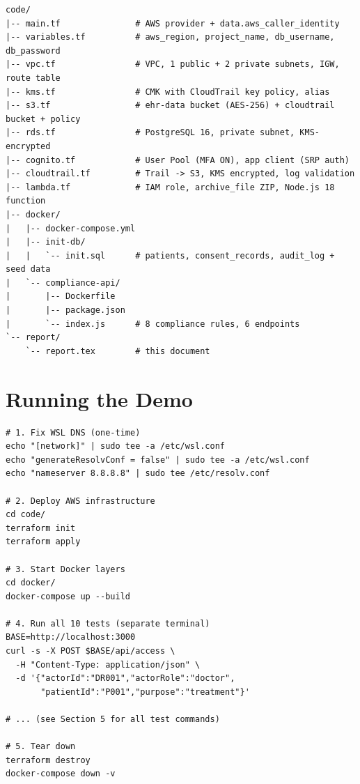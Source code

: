 \documentclass[12pt,a4paper]{article}
\begin{document}
\begin{lstlisting}[style=bash, caption={Complete project file tree}]
code/
|-- main.tf               # AWS provider + data.aws_caller_identity
|-- variables.tf          # aws_region, project_name, db_username, db_password
|-- vpc.tf                # VPC, 1 public + 2 private subnets, IGW, route table
|-- kms.tf                # CMK with CloudTrail key policy, alias
|-- s3.tf                 # ehr-data bucket (AES-256) + cloudtrail bucket + policy
|-- rds.tf                # PostgreSQL 16, private subnet, KMS-encrypted
|-- cognito.tf            # User Pool (MFA ON), app client (SRP auth)
|-- cloudtrail.tf         # Trail -> S3, KMS encrypted, log validation
|-- lambda.tf             # IAM role, archive_file ZIP, Node.js 18 function
|-- docker/
|   |-- docker-compose.yml
|   |-- init-db/
|   |   `-- init.sql      # patients, consent_records, audit_log + seed data
|   `-- compliance-api/
|       |-- Dockerfile
|       |-- package.json
|       `-- index.js      # 8 compliance rules, 6 endpoints
`-- report/
    `-- report.tex        # this document
\end{lstlisting}

\section{Running the Demo}
\label{sec:running}

\begin{lstlisting}[style=bash, caption={Complete deployment and test steps}]
# 1. Fix WSL DNS (one-time)
echo "[network]" | sudo tee -a /etc/wsl.conf
echo "generateResolvConf = false" | sudo tee -a /etc/wsl.conf
echo "nameserver 8.8.8.8" | sudo tee /etc/resolv.conf

# 2. Deploy AWS infrastructure
cd code/
terraform init
terraform apply

# 3. Start Docker layers
cd docker/
docker-compose up --build

# 4. Run all 10 tests (separate terminal)
BASE=http://localhost:3000
curl -s -X POST $BASE/api/access \
  -H "Content-Type: application/json" \
  -d '{"actorId":"DR001","actorRole":"doctor",
       "patientId":"P001","purpose":"treatment"}'

# ... (see Section 5 for all test commands)

# 5. Tear down
terraform destroy
docker-compose down -v
\end{lstlisting}

\end{document}
